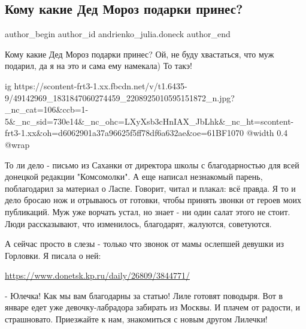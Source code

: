  
 
 
 
 
 
\subsection{Кому какие Дед Мороз подарки принес?}
\label{sec:31_12_2018.fb.andrienko_julia.doneck.1.ded_moroz}
 
\ifcmt
 author_begin
   author_id andrienko_julia.doneck
 author_end
\fi

Кому какие Дед Мороз подарки принес? Ой, не буду хвастаться, что муж подарил,
да я на это и сама ему намекала) То такэ! 

\ifcmt
  ig https://scontent-frt3-1.xx.fbcdn.net/v/t1.6435-9/49142969_1831847060274459_2208925010595151872_n.jpg?_nc_cat=106&ccb=1-5&_nc_sid=730e14&_nc_ohc=LXyXsb3cHnIAX_JbLhk&_nc_ht=scontent-frt3-1.xx&oh=d6062901a37a96625f5ff78df6a632ae&oe=61BF1070
  @width 0.4
  @wrap 
\fi

То ли дело - письмо из Саханки от директора школы с благодарностью для всей
донецкой редакции "Комсомолки". А еще написал незнакомый парень, поблагодарил
за материал о Ласпе. Говорит, читал и плакал: всё правда. Я то и дело бросаю
нож и отрываюсь от готовки, чтобы принять звонки от героев моих публикаций. Муж
уже ворчать устал, но знает - ни один салат этого не стоит. Люди рассказывают,
что изменилось, благодарят, жалуются, советуются.

А сейчас просто в слезы - только что звонок от мамы ослепшей девушки из
Горловки. Я писала о ней: 

\url{https://www.donetsk.kp.ru/daily/26809/3844771/}

- Юлечка! Как мы вам благодарны за статью! Лиле готовят поводыря. Вот в январе
едет уже девочку-лабрадора забирать из Москвы. И плачем от радости, и
страшновато. Приезжайте к нам, знакомиться с новым другом Лилечки!

